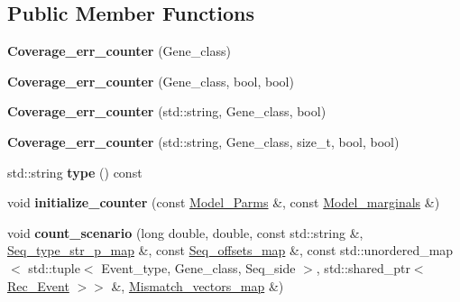 \subsection*{Public Member Functions}
\begin{DoxyCompactItemize}
\item 
\mbox{\label{classCoverage__err__counter_a1744bf9764b432f500131439fd4afcfa}} 
{\bfseries Coverage\+\_\+err\+\_\+counter} (Gene\+\_\+class)
\item 
\mbox{\label{classCoverage__err__counter_a86f1b7a29bf0244cfd56e564329725e1}} 
{\bfseries Coverage\+\_\+err\+\_\+counter} (Gene\+\_\+class, bool, bool)
\item 
\mbox{\label{classCoverage__err__counter_a8d768e2bcf4c66d5b81c7cab85ac3701}} 
{\bfseries Coverage\+\_\+err\+\_\+counter} (std\+::string, Gene\+\_\+class, bool)
\item 
\mbox{\label{classCoverage__err__counter_ab0c7dad32b9a61a83a3baf7f50fdab33}} 
{\bfseries Coverage\+\_\+err\+\_\+counter} (std\+::string, Gene\+\_\+class, size\+\_\+t, bool, bool)
\item 
\mbox{\label{classCoverage__err__counter_afff8475b6327de18697e9d2068fb84b5}} 
std\+::string {\bfseries type} () const
\item 
\mbox{\label{classCoverage__err__counter_a333faaf6f622fa7cee77d34b226126d8}} 
void {\bfseries initialize\+\_\+counter} (const \hyperlink{classModel__Parms}{Model\+\_\+\+Parms} \&, const \hyperlink{classModel__marginals}{Model\+\_\+marginals} \&)
\item 
\mbox{\label{classCoverage__err__counter_a6294a2c63795daeb6fea3506f27b19ac}} 
void {\bfseries count\+\_\+scenario} (long double, double, const std\+::string \&, \hyperlink{classEnum__fast__memory__map}{Seq\+\_\+type\+\_\+str\+\_\+p\+\_\+map} \&, const \hyperlink{classEnum__fast__memory__dual__key__map}{Seq\+\_\+offsets\+\_\+map} \&, const std\+::unordered\+\_\+map$<$ std\+::tuple$<$ Event\+\_\+type, Gene\+\_\+class, Seq\+\_\+side $>$, std\+::shared\+\_\+ptr$<$ \hyperlink{classRec__Event}{Rec\+\_\+\+Event} $>$$>$ \&, \hyperlink{classEnum__fast__memory__map}{Mismatch\+\_\+vectors\+\_\+map} \&)
$$
\end{DoxyCompactItemize}
